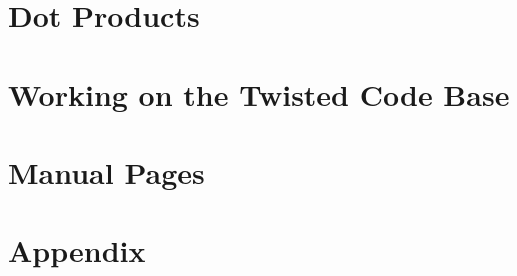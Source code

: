 \documentclass[oneside]{book}
\begin{document}
\chapter{Dot Products}




\chapter{Working on the Twisted Code Base}






\chapter{Manual Pages}


\clearpage

\clearpage

\clearpage

\clearpage

\clearpage

\clearpage

\clearpage

\clearpage

\clearpage

\clearpage

\clearpage

\clearpage

\clearpage
 


\chapter{Appendix}




\end{document}
